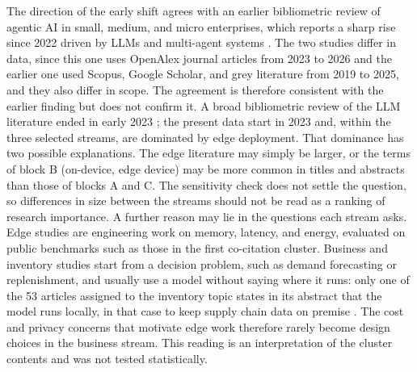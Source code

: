 The direction of the early shift agrees with an earlier bibliometric review of agentic AI in small, medium, and micro enterprises, which reports a sharp rise since 2022 driven by LLMs and multi-agent systems \parencite{olujimi2025}. The two studies differ in data, since this one uses OpenAlex journal articles from 2023 to 2026 and the earlier one used Scopus, Google Scholar, and grey literature from 2019 to 2025, and they also differ in scope. The agreement is therefore consistent with the earlier finding but does not confirm it. A broad bibliometric review of the LLM literature ended in early 2023 \parencite{fan2024}; the present data start in 2023 and, within the three selected streams, are dominated by edge deployment. That dominance has two possible explanations. The edge literature may simply be larger, or the terms of block B (on-device, edge device) may be more common in titles and abstracts than those of blocks A and C. The sensitivity check does not settle the question, so differences in size between the streams should not be read as a ranking of research importance. A further reason may lie in the questions each stream asks. Edge studies are engineering work on memory, latency, and energy, evaluated on public benchmarks such as those in the first co-citation cluster. Business and inventory studies start from a decision problem, such as demand forecasting or replenishment, and usually use a model without saying where it runs: only one of the 53 articles assigned to the inventory topic states in its abstract that the model runs locally, in that case to keep supply chain data on premise \parencite{wong2026}. The cost and privacy concerns that motivate edge work therefore rarely become design choices in the business stream. This reading is an interpretation of the cluster contents and was not tested statistically.

